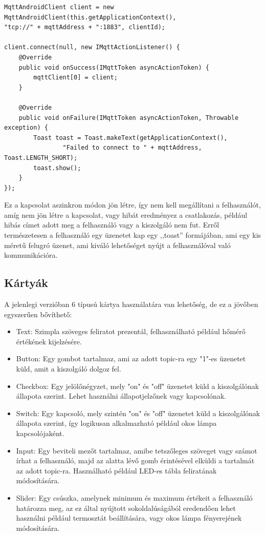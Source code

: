 \documentclass[]{thesis-ekf}
\theoremstyle{definition}
\theoremstyle{remark}
\begin{document}
\lstset{language=Java}  
\begin{lstlisting}[frame=single]
MqttAndroidClient client = new MqttAndroidClient(this.getApplicationContext(),
"tcp://" + mqttAddress + ":1883", clientId);

client.connect(null, new IMqttActionListener() {
	@Override
	public void onSuccess(IMqttToken asyncActionToken) {
		mqttClient[0] = client;
	}

	@Override
	public void onFailure(IMqttToken asyncActionToken, Throwable exception) {
		Toast toast = Toast.makeText(getApplicationContext(),
				"Failed to connect to " + mqttAddress, Toast.LENGTH_SHORT);
		toast.show();
	}
});
\end{lstlisting}

Ez a kapcsolat aszinkron módon jön létre, így nem kell megállítani a felhasználót, amíg nem jön létre a
kapcsolat, vagy hibát eredményez a csatlakozás, például hibás címet adott meg a felhasználó vagy
a kiszolgáló nem fut. Erről természetesen a felhasználó egy üzenetet kap egy ,,toast'' formájában, ami egy
kis méretű felugró üzenet, ami kiváló lehetőséget nyújt a felhasználóval való kommunikációra.

\subsection{Kártyák}
A jelenlegi verzióban 6 típusú kártya használatára van lehetőség, de ez a jövőben egyszerűen bővíthető:
\begin{itemize}
	\item Text: Szimpla szöveges feliratot prezentál, felhasználható például hőmérő értékének kijelzésére.
	\item Button: Egy gombot tartalmaz, ami az adott topic-ra egy "1"-es üzenetet küld, amit a kiszolgáló
	dolgoz fel.
	\item Checkbox: Egy jelölőnégyzet, mely "on" és "off" üzenetet küld a kiszolgálónak állapota szerint.
	Lehet használni állapotjelzőnek vagy kapcsolónak.
	\item Switch: Egy kapcsoló, mely szintén "on" és "off" üzenetet küld a kiszolgálónak állapota szerint,
	így logikusan alkalmazható például okos lámpa kapcsolójaként.
	\item Input: Egy beviteli mezőt tartalmaz, amibe tetszőleges szöveget vagy számot írhat a felhasználó,
	majd az alatta lévő gomb érintésével elküldi a tartalmát az adott topic-ra. Használható például LED-es
	tábla feliratának módosítására.
	\item Slider: Egy csúszka, amelynek minimum és maximum értékeit a felhasználó határozza meg, az ez
	által nyújtott sokoldalúságából eredendően lehet használni például termosztát beállítására, vagy
	okos lámpa fényerejének módosítására.
\end{itemize}
\end{document}
